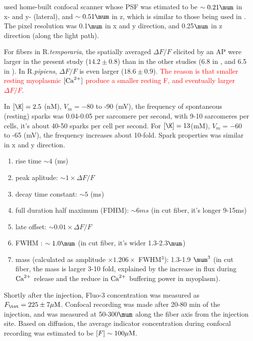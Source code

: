 \citep{hollingworth2001} used home-built confocal scanner whose PSF was etimated to
be $\sim 0.21 \mum$ in x- and y- (lateral), and $\sim 0.51 \mum$ in z, which is
similar to those being used in \citep{parker1997,wier2000}.
The pixel resolution was 0.1$\mum$ in x and y direction, and 0.25$\mum$ in z direction
(along the light path).

For fibers in R.{\it temporaria}, the spatially averaged $\Delta F/F$
elicited by an AP were larger in the present study ($14.2\pm 0.8$) than in the
other studies (6.8 in \citep{harkins1993}, and 6.5 in \citep{hollingworth2000}).
In R.{\it pipiens}, $\Delta F/F$ is even larger ($18.6\pm 0.9$).
\textcolor{red}{The reason is that smaller resting myoplasmic $[{\text{Ca}^{2+}}]$ produce a
smaller resting F, and eventually larger $\Delta F/F$}. 

In $[\K]=2.5$ (nM), $V_m=-80$ to -90 (mV), the frequency of spontaneous
(resting) sparks was 0.04-0.05 per sarcomere per second, with 9-10 sarcomeres
per cells, it's about 40-50 sparks per cell per second. For $[\K]=13$(mM),
$V_m=-60$ to -65 (mV), the frequency increases about 10-fold. Spark properties
was similar in x and y direction.

\begin{enumerate}
  \item rise time $\sim 4$ (ms)
  \item peak aplitude: $\sim 1\times \Delta F/F$
  \item decay time constant: $\sim 5$ (ms)
  \item full duration half maximum (FDHM): $\sim 6ms$ (in cut fiber, it's
  longer 9-15ms)
  \item late offset: $\sim 0.01 \times \Delta F/F$
  \item FWHM : $\sim 1.0\mum$ (in cut fiber, it's wider 1.3-2.3$\mum$)
  \item mass (calculated as amplitude $\times 1.206\times $ FWHM$^3$): 1.3-1.9
  $\mum^3$ (in cut fiber, the mass is larger 3-10 fold, explained by the
  increase in flux during ${\text{Ca}^{2+}}$ release and the reduce in ${\text{Ca}^{2+}}$ buffering
  power in myoplasm).
\end{enumerate}

Shortly after the injection, Fluo-3 concentration was measured as
$F_\tot=225\pm7 \muM$. Confocal recording was made after 20-80 min of the
injection, and was measured at 50-300$\mum$ along the fiber axis from the
injection site. Based on diffusion, the average
indicator concentration during confocal recording was estimated to be
$[F]\sim 100{\mu\text{M}}$.

